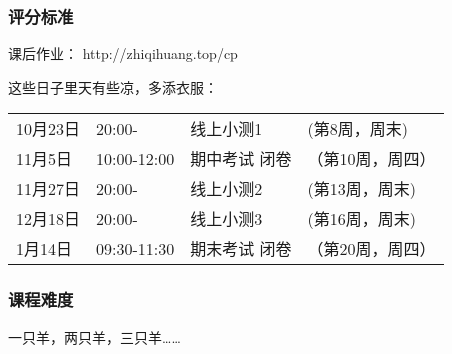 \documentclass[CJK,13pt]{beamer}
\date{}
\begin{document}
  \bch
{}



\begin{frame}
\frametitle{评分标准}


\skipline

课后作业： http://zhiqihuang.top/cp

\skiplines


这些日子里天有些凉，多添衣服\bye：
\begin{tabular}{llll}
10月23日 & 20:00-  & 线上小测1 & (第8周，周末) \\   
11月5日 & 10:00-12:00 & 期中考试 闭卷 & （第10周，周四）\\
11月27日 & 20:00-  & 线上小测2 & (第13周，周末) \\
12月18日 & 20:00-  & 线上小测3 & (第16周，周末) \\   
1月14日 & 09:30-11:30 & 期末考试 闭卷 & （第20周，周四） 
\end{tabular}

\end{frame}




\begin{frame}
  \frametitle{课程难度}

      

  一只羊，两只羊，三只羊……
  
\end{frame}


\ech
\end{document}
